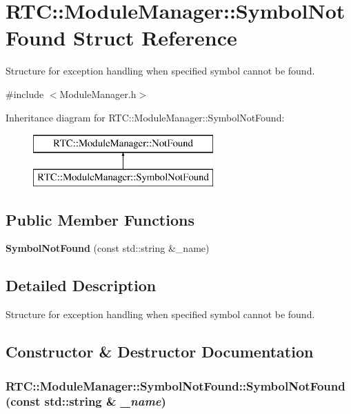 \section{RTC::ModuleManager::SymbolNotFound Struct Reference}
\label{structRTC_1_1ModuleManager_1_1SymbolNotFound}


Structure for exception handling when specified symbol cannot be found.  




{\ttfamily \#include $<$ModuleManager.h$>$}

Inheritance diagram for RTC::ModuleManager::SymbolNotFound:\begin{figure}[H]
\begin{center}
\leavevmode
\includegraphics[height=2cm]{structRTC_1_1ModuleManager_1_1SymbolNotFound}
\end{center}
\end{figure}
\subsection*{Public Member Functions}
\begin{DoxyCompactItemize}
\item 
{\bf SymbolNotFound} (const std::string \&\_\-name)
\end{DoxyCompactItemize}


\subsection{Detailed Description}
Structure for exception handling when specified symbol cannot be found. 

\subsection{Constructor \& Destructor Documentation}
\subsubsection[{SymbolNotFound}]{\setlength{\rightskip}{0pt plus 5cm}RTC::ModuleManager::SymbolNotFound::SymbolNotFound (const std::string \& {\em \_\-name})\hspace{0.3cm}{\ttfamily  [inline]}}\label{structRTC_1_1ModuleManager_1_1SymbolNotFound_a15ff5cfb15c5eb9f4bb4501752e008ef}
